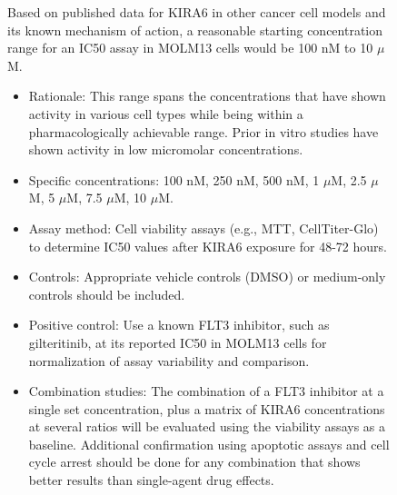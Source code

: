 \begin{figure}[htbp!]
\begin{tcolorbox}[
    colback=black!5!white,
    colframe=black!60!white,
    title=\textbf{KIRA6 for AML (continued)},
    fonttitle=\bfseries,
    arc=3mm,
    boxrule=1pt,
    bottomrule=2pt,
]
Based on published data for KIRA6 in other cancer cell models and its known mechanism of action, a reasonable starting concentration range for an IC50 assay in MOLM13 cells would be 100 nM to 10 $\mu$M.
\begin{itemize}
    \item Rationale: This range spans the concentrations that have shown activity in various cell types while being within a pharmacologically achievable range. Prior in vitro studies have shown activity in low micromolar concentrations.
    \item Specific concentrations: 100 nM, 250 nM, 500 nM, 1 $\mu$M, 2.5 $\mu$M, 5 $\mu$M, 7.5 $\mu$M, 10 $\mu$M.
    \item  Assay method: Cell viability assays (e.g., MTT, CellTiter-Glo) to determine IC50 values after KIRA6 exposure for 48-72 hours.
    \item Controls: Appropriate vehicle controls (DMSO) or medium-only controls should be included.
    \item Positive control:  Use a known FLT3 inhibitor, such as gilteritinib, at its reported IC50 in MOLM13 cells for normalization of assay variability and comparison.
    \item Combination studies: The combination of a FLT3 inhibitor at a single set concentration, plus a matrix of KIRA6 concentrations at several ratios will be evaluated using the viability assays as a baseline. Additional confirmation using apoptotic assays and cell cycle arrest should be done for any combination that shows better results than single-agent drug effects.
\end{itemize}


\end{tcolorbox}
\end{figure}
